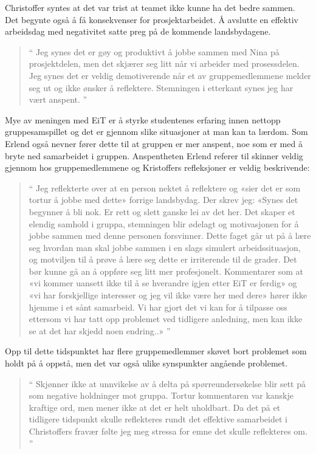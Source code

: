 Christoffer syntes at det var trist at teamet ikke kunne ha det bedre sammen. Det begynte også å få konsekvenser
for prosjektarbeidet. Å avslutte en effektiv arbeidsdag med negativitet satte preg på de kommende landsbydagene.

\begin{quote}``
Jeg synes det er gøy og produktivt å jobbe sammen med Nina på prosjektdelen, men det skjærer seg litt når vi 
arbeider med prosessdelen. Jeg synes det er veldig demotiverende når et av gruppemedlemmene melder seg ut 
og ikke ønsker å reflektere. Stemningen i etterkant synes jeg har vært anspent.
''\end{quote} 

Mye av meningen med EiT er å styrke studentenes erfaring innen nettopp gruppesamspillet og det er gjennom
slike situasjoner at man kan ta lærdom. 
Som Erlend også nevner fører dette til at gruppen er mer anspent, noe som er med å bryte ned samarbeidet i 
gruppen. Anspentheten Erlend referer til skinner veldig gjennom hos gruppemedlemmene og Kristoffers refleksjoner 
er veldig beskrivende:

\begin{quote}``
Jeg reflekterte over at en person nektet å reflektere og «sier det er som tortur å jobbe med dette» forrige 
landsbydag. Der skrev jeg: «Synes det begynner å bli nok. Er rett og slett ganske lei av det her. Det skaper et 
elendig samhold i gruppa, stemningen blir ødelagt og motivasjonen for å jobbe sammen med denne personen 
forsvinner. Dette faget går ut på å lære seg hvordan man skal jobbe sammen i en slags simulert arbeidssituasjon, 
og motviljen til å prøve å lære seg dette er irriterende til de grader. Det bør kunne gå an å oppføre seg litt mer 
profesjonelt. Kommentarer som at «vi kommer uansett ikke til å se hverandre igjen etter EiT er ferdig» og «vi har 
forskjellige interesser og jeg vil ikke være her med dere» hører ikke hjemme i et sånt samarbeid. Vi har gjort det 
vi kan for å tilpasse oss ettersom vi har tatt opp problemet ved tidligere anledning, men kan ikke se at det har 
skjedd noen endring..» 
''\end{quote} 

Opp til dette tidspunktet har flere gruppemedlemmer skøvet bort problemet som holdt på å oppstå, men det var også 
ulike synspunkter angående problemet.

\begin{quote}``
Skjønner ikke at unnvikelse av å delta på spørreundersøkelse blir sett på som negative holdninger mot gruppa. 
Tortur kommentaren var kanskje kraftige ord, men mener ikke at det er helt uholdbart. Da det på et tidligere tidspunkt skulle
reflekteres rundt det effektive samarbeidet i Christoffers fravær følte jeg meg stressa for emne det skulle reflekteres om.
''\end{quote} 

